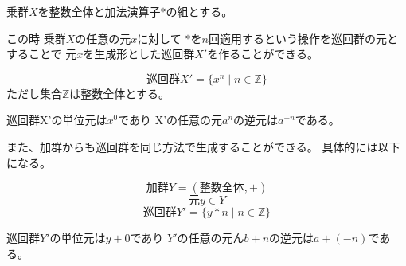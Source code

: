 \documentclass{jsarticle}
\begin{document}
乗群$X$を整数全体と加法演算子$*$の組とする。

この時 乗群$X$の任意の元$x$に対して
$*$を$n$回適用するという操作を巡回群の元とすることで
元$x$を生成形とした巡回群$X'$を作ることができる。

\[
    巡回群X' = \{ x^n \mid n \in \mathbb{Z} \}
\]
ただし集合$\mathbb{Z}$は整数全体とする。

巡回群X'の単位元は$x^0$であり
X'の任意の元$a^n$の逆元は$a^{-n}$である。

また、加群からも巡回群を同じ方法で生成することができる。
具体的には以下になる。

\[ 加群Y = (整数全体, +) \]
\[ 元y \in Y \]
\[ 巡回群Y' = \{ y*n \mid n \in \mathbb{Z} \} \]


巡回群$Y'$の単位元は$y+0$であり
$Y'$の任意の元ん$b+n$の逆元は$a+(-n)$である。
\end{document}

